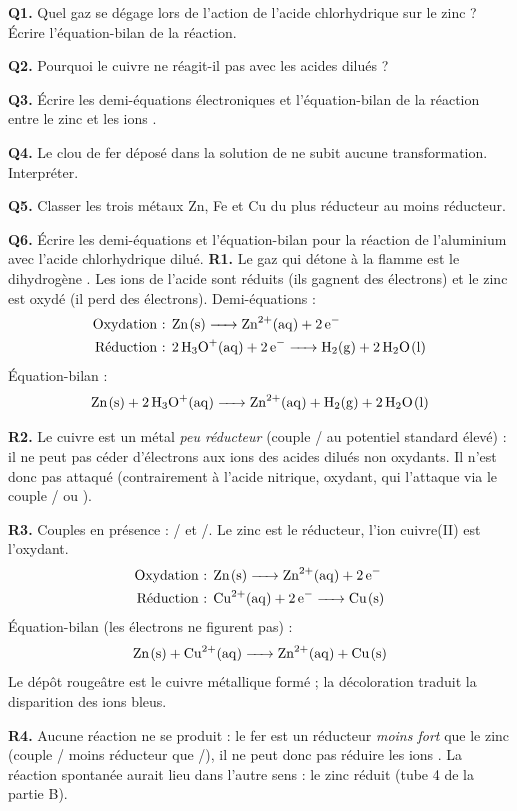 \documentclass[11pt]{article}
\newcommand{\cle}[1]{{\popxbold\color{popdark}#1}}
\begin{document}
\begin{exoresolu}
\textbf{Q1.} Quel gaz se dégage lors de l'action de l'acide chlorhydrique sur le zinc ? Écrire l'équation-bilan de la réaction.

\textbf{Q2.} Pourquoi le cuivre ne réagit-il pas avec les acides dilués ?

\textbf{Q3.} Écrire les demi-équations électroniques et l'équation-bilan de la réaction entre le zinc et les ions .

\textbf{Q4.} Le clou de fer déposé dans la solution de  ne subit aucune transformation. Interpréter.

\textbf{Q5.} Classer les trois métaux Zn, Fe et Cu du plus réducteur au moins réducteur.

\textbf{Q6.} Écrire les demi-équations et l'équation-bilan pour la réaction de l'aluminium avec l'acide chlorhydrique dilué.
\tcblower
\textbf{R1.} Le gaz qui détone à la flamme est le \cle{dihydrogène} . Les ions  de l'acide sont réduits (ils gagnent des électrons) et le zinc est oxydé (il perd des électrons). Demi-équations :
\begin{align*}
\text{Oxydation : } & \ce{Zn(s) -> Zn^2+(aq) + 2e-} \\
\text{Réduction : } & \ce{2H3O+(aq) + 2e- -> H2(g) + 2H2O(l)}
\end{align*}
Équation-bilan :
\[ \ce{Zn(s) + 2H3O+(aq) -> Zn^2+(aq) + H2(g) + 2H2O(l)} \]

\textbf{R2.} Le cuivre est un métal \emph{peu réducteur} (couple / au potentiel standard élevé) : il ne peut pas céder d'électrons aux ions  des acides dilués non oxydants. Il n'est donc pas attaqué (contrairement à l'acide nitrique, oxydant, qui l'attaque via le couple / ou ).

\textbf{R3.} Couples en présence : / et /. Le zinc est le réducteur, l'ion cuivre(II) est l'oxydant.
\begin{align*}
\text{Oxydation : } & \ce{Zn(s) -> Zn^2+(aq) + 2e-} \\
\text{Réduction : } & \ce{Cu^2+(aq) + 2e- -> Cu(s)}
\end{align*}
Équation-bilan (les électrons ne figurent pas) :
\[ \ce{Zn(s) + Cu^2+(aq) -> Zn^2+(aq) + Cu(s)} \]
Le dépôt rougeâtre est le cuivre métallique formé ; la décoloration traduit la disparition des ions  bleus.

\textbf{R4.} Aucune réaction ne se produit : le fer est un réducteur \emph{moins fort} que le zinc (couple / moins réducteur que /), il ne peut donc pas réduire les ions . La réaction spontanée aurait lieu dans l'autre sens : le zinc réduit  (tube 4 de la partie B).


\end{exoresolu}
\end{document}
